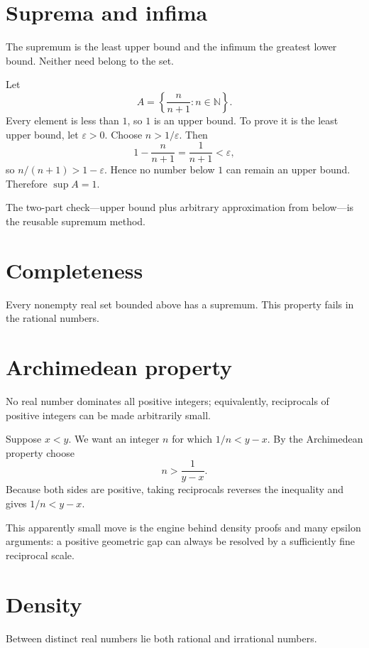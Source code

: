 \section{Suprema and infima}
The supremum is the least upper bound and the infimum the greatest lower bound. Neither need belong to the set.


\begin{example}\label{ex:ii01-expand-01}
Let
\[
A=\left\{\frac{n}{n+1}:n\in\mathbb N\right\}.
\]
Every element is less than \(1\), so \(1\) is an upper bound. To prove it is
the least upper bound, let \(\varepsilon>0\). Choose \(n>1/\varepsilon\). Then
\[
1-\frac{n}{n+1}=\frac1{n+1}<\varepsilon,
\]
so \(n/(n+1)>1-\varepsilon\). Hence no number below \(1\) can remain an upper
bound. Therefore \(\sup A=1\).

The two-part check---upper bound plus arbitrary approximation from below---is
the reusable supremum method.
\end{example}
\section{Completeness}
Every nonempty real set bounded above has a supremum. This property fails in the rational numbers.

\section{Archimedean property}
No real number dominates all positive integers; equivalently, reciprocals of positive integers can be made arbitrarily small.


\begin{example}\label{ex:ii01-expand-02}
Suppose \(x<y\). We want an integer \(n\) for which \(1/n<y-x\). By the
Archimedean property choose
\[
n>\frac1{y-x}.
\]
Because both sides are positive, taking reciprocals reverses the inequality and
gives \(1/n<y-x\).

This apparently small move is the engine behind density proofs and many
epsilon arguments: a positive geometric gap can always be resolved by a
sufficiently fine reciprocal scale.
\end{example}
\section{Density}
Between distinct real numbers lie both rational and irrational numbers.

